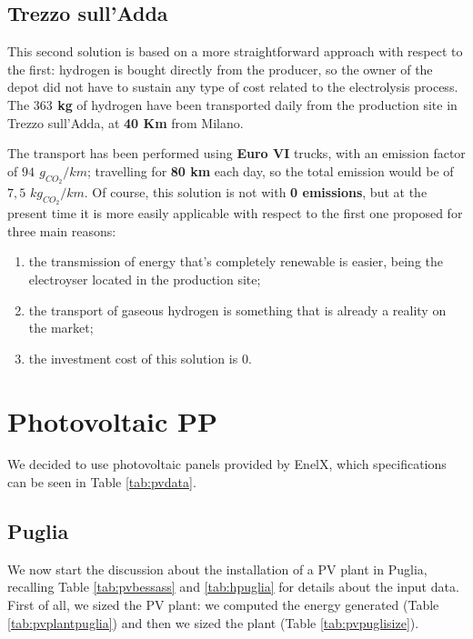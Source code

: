 \subsection{Trezzo sull'Adda}
This second solution is based on a more straightforward approach with respect to the first: hydrogen is bought directly from the producer, so the owner of the depot did not have to sustain any type of cost related to the electrolysis process. The \textbf{$363$ kg} of hydrogen have been transported daily from the production site in Trezzo sull'Adda, at \textbf{ 40 Km} from Milano.

The transport has been performed using \textbf{Euro VI} trucks, with an emission factor of \textbf{$94$ $g_{CO_2}/km$}; travelling for \textbf{80 km} each day, so the total emission would be of {$7,5$ $kg_{CO_2}/km$}. Of course, this solution is not with \textbf{0 emissions}, but at the present time it is more easily applicable with respect to the first one proposed for three main reasons:

\begin{enumerate}
\item the transmission of energy that's completely renewable is easier, being the electroyser located in the production site;
\item the transport of gaseous hydrogen is something that is already a reality on the market;
\item the investment cost of this solution is 0.
\end{enumerate}

\section{Photovoltaic PP}
We decided to use photovoltaic panels provided by EnelX, which specifications can be seen in Table \ref{tab:pvdata}.



\subsection{Puglia}
We now start the discussion about the installation of a PV plant in Puglia, recalling Table \ref{tab:pvbessass} and \ref{tab:hpuglia} for details about the input data. 
First of all, we sized the PV plant: we computed the energy generated (Table \ref{tab:pvplantpuglia}) and then we sized the plant (Table \ref{tab:pvpuglisize}).



